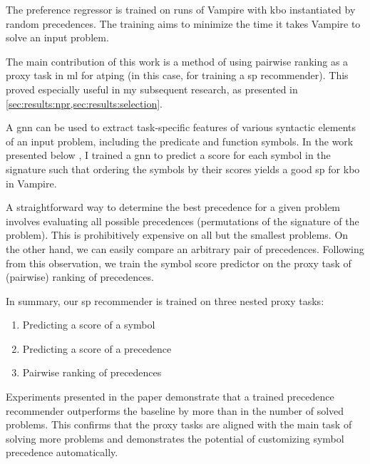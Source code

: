 The preference regressor is trained on runs of Vampire with \gls{kbo} instantiated by random precedences.
The training aims to minimize the time it takes Vampire to solve an input problem.

The main contribution of this work is a method of using pairwise ranking as a proxy task in \gls{ml} for \gls{atping} (in this case, for training a \gls{sp} recommender).
This proved especially useful in my subsequent research,
as presented in \cref{sec:results:npr,sec:results:selection}.


\label{sec:results:npr}

A \gls{gnn} can be used to extract task-specific features of various syntactic elements of an input problem,
including the predicate and function symbols.
In the work presented below \cite{DBLP:conf/cade/Bartek021},
I trained a \gls{gnn} to predict a score for each symbol in the signature such that ordering the symbols by their scores yields a good \gls{sp} for \gls{kbo} in Vampire.


A straightforward way to determine the best precedence for a given problem involves evaluating all possible precedences (permutations of the signature of the problem).
This is prohibitively expensive on all but the smallest problems.
On the other hand, we can easily compare an arbitrary pair of precedences.
Following from this observation, we train the symbol score predictor on the proxy task of (pairwise) ranking of precedences.

In summary, our \gls{sp} recommender is trained on three nested proxy tasks:
\begin{enumerate}
\item Predicting a score of a symbol
\item Predicting a score of a precedence
\item Pairwise ranking of precedences
\end{enumerate}

Experiments presented in the paper demonstrate that a trained precedence recommender outperforms the baseline by more than  in the number of solved problems.
This confirms that the proxy tasks are aligned with the main task of solving more problems and demonstrates the potential of customizing symbol precedence automatically.

